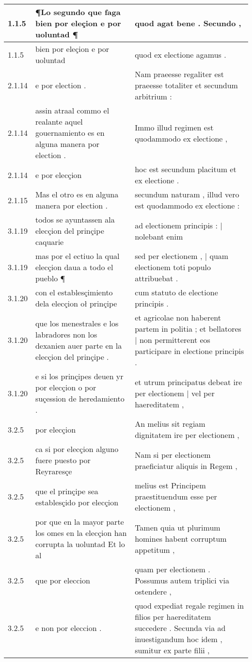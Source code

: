 \begin{tabular}{|p{1cm}|p{6.5cm}|p{6.5cm}|}

\hline
1.1.5 & ¶Lo segundo que faga bien por eleçion e por uoluntad ¶ & quod agat bene . Secundo , \\\hline
1.1.5 & bien por eleçion e por uoluntad & quod ex electione agamus . \\\hline
2.1.14 & e por election . & Nam praeesse regaliter est praeesse totaliter et secundum arbitrium : \\\hline
2.1.14 & assin atraal commo el realante aquel gouernamiento es en alguna manera por election . & Immo illud regimen est quodammodo ex electione , \\\hline
2.1.14 & e por elecçion & hoc est secundum placitum et ex electione . \\\hline
2.1.15 & Mas el otro es en alguna manera por election . & secundum naturam , illud vero est quodammodo ex electione : \\\hline
3.1.19 & todos se ayuntassen ala elecçion del prinçipe caquarie & ad electionem principis : | nolebant enim \\\hline
3.1.19 & mas por el ectiuo la qual elecçion daua a todo el pueblo ¶ & sed per electionem , | quam electionem toti populo attribuebat . \\\hline
3.1.20 & con el establesçimiento dela elecçion oł prinçipe & cum statuto de electione principis . \\\hline
3.1.20 & que los menestrales e los labradores non los dexanien auer parte en la elecçion del prinçipe . & et agricolae non haberent partem in politia ; et bellatores | non permitterent eos participare in electione principis . \\\hline
3.1.20 & e si los prinçipes deuen yr por elecçion o por suçession de heredamiento . & et utrum principatus debeat ire per electionem | vel per haereditatem , \\\hline
3.2.5 & por elecçion & An melius sit regiam dignitatem ire per electionem , \\\hline
3.2.5 & ca si por elecçion alguno fuere puesto por Reyraresçe & Nam si per electionem praeficiatur aliquis in Regem , \\\hline
3.2.5 & que el prinçipe sea establesçido por elecçion & melius est Principem praestituendum esse per electionem , \\\hline
3.2.5 & por que en la mayor parte los omes en la elecçion han corrupta la uoluntad Et lo al & Tamen quia ut plurimum homines habent corruptum appetitum , \\\hline
3.2.5 & que por eleccion & quam per electionem . Possumus autem triplici via ostendere , \\\hline
3.2.5 & e non por eleccion . & quod expediat regale regimen in filios per haereditatem succedere . Secunda via ad inuestigandum hoc idem , sumitur ex parte filii , \\\hline

\end{tabular}
